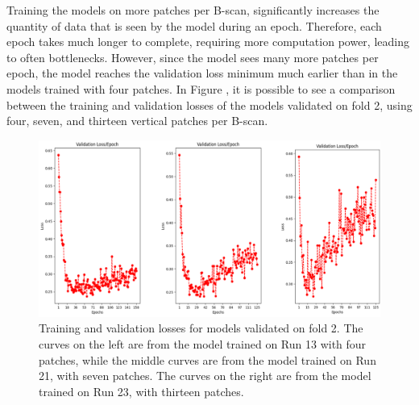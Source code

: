 Training the models on more patches per B-scan, significantly increases the quantity of data that is seen by the model during an epoch. Therefore, each epoch takes much longer to complete, requiring more computation power, leading to often bottlenecks. However, since the model sees many more patches per epoch, the model reaches the validation loss minimum much earlier than in the models trained with four patches. In Figure , it is possible to see a comparison between the training and validation losses of the models validated on fold 2, using four, seven, and thirteen vertical patches per B-scan.

\begin{figure}[!ht]
	\centering
	\includegraphics[width=1.0\linewidth]{figures/ValidationLossesFourSevenThirteenPatches.png}
	\caption{Training and validation losses for models validated on fold 2. The curves on the left are from the model trained on Run 13 with four patches, while the middle curves are from the model trained on Run 21, with seven patches. The curves on the right are from the model trained on Run 23, with thirteen patches.}
	\label{fig:ValidationLossesFourSevenThirteenPatches}
\end{figure}


